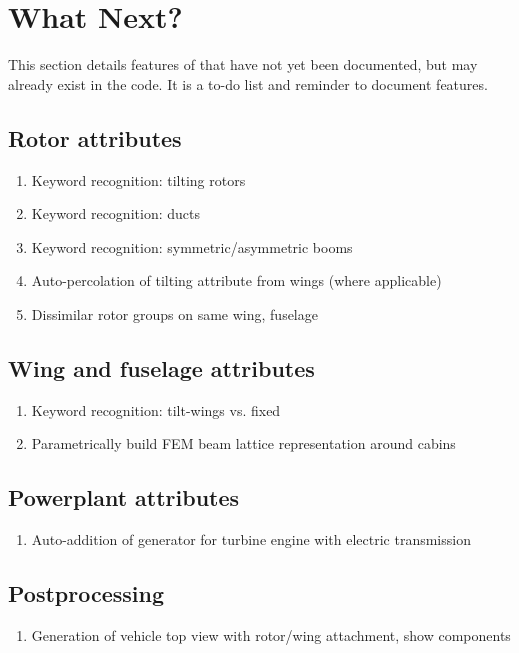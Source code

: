 \section{What Next?}
This section details features of \hydra \spc that have not yet been documented, but may already exist in the code. It is a to-do list and reminder to document features.

\subsection{Rotor attributes}
\begin{enumerate}
\item Keyword recognition: tilting rotors 
\item Keyword recognition: ducts
\item Keyword recognition: symmetric/asymmetric booms
\item Auto-percolation of tilting attribute from wings (where applicable)
\item Dissimilar rotor groups on same wing, fuselage 
\end{enumerate}

\subsection{Wing and fuselage attributes}
\begin{enumerate}
\item Keyword recognition: tilt-wings vs. fixed 
\item Parametrically build FEM beam lattice representation around cabins 
\end{enumerate}

\subsection{Powerplant attributes}
\begin{enumerate}
\item Auto-addition of generator for turbine engine with electric transmission
\end{enumerate}

\subsection{Postprocessing}
\begin{enumerate}
\item Generation of vehicle top view with rotor/wing attachment, show components
\end{enumerate}